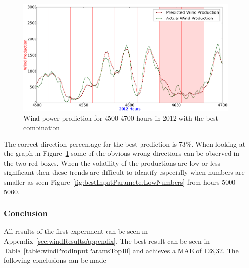 \begin{figure}[H]
\centering
\includegraphics[width=0.99\textwidth]{billeder/bestInputCombi4500-4700.png}
\caption{Wind power prediction for 4500-4700 hours in 2012 with the best combination}
\label{fig:bestInputCombi4500-4700}
\end{figure} 

The correct direction percentage for the best prediction is 73\%. When looking at the graph in Figure~\ref{fig:bestInputCombi4500-4700} some of the obvious wrong directions can be observed in the two red boxes. When the volatility of the productions are low or less significant then these trends are difficult to identify especially when numbers are smaller as seen Figure~\ref{fig:bestInputParameterLowNumbers} from hours 5000-5060.

\subsubsection{Conclusion}
All results of the first experiment can be seen in Appendix~\ref{sec:windResultsAppendix}. The best result can be seen in Table~\ref{table:windProdInputParamsTop10} and achieves a MAE of 128,32. The following conclusions can be made: 

